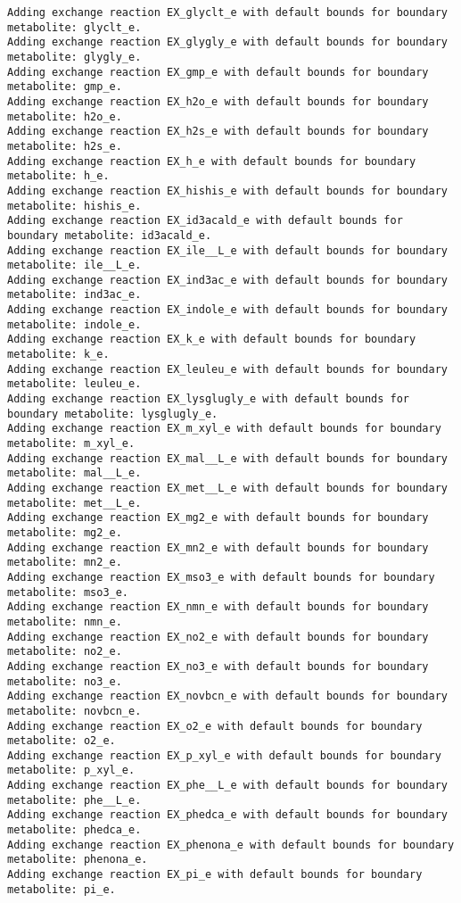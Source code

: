 \documentclass[
  letterpaper,
  DIV=11,
  numbers=noendperiod]{scrartcl}
\begin{document}
\begin{verbatim}
Adding exchange reaction EX_glyclt_e with default bounds for boundary metabolite: glyclt_e.
Adding exchange reaction EX_glygly_e with default bounds for boundary metabolite: glygly_e.
Adding exchange reaction EX_gmp_e with default bounds for boundary metabolite: gmp_e.
Adding exchange reaction EX_h2o_e with default bounds for boundary metabolite: h2o_e.
Adding exchange reaction EX_h2s_e with default bounds for boundary metabolite: h2s_e.
Adding exchange reaction EX_h_e with default bounds for boundary metabolite: h_e.
Adding exchange reaction EX_hishis_e with default bounds for boundary metabolite: hishis_e.
Adding exchange reaction EX_id3acald_e with default bounds for boundary metabolite: id3acald_e.
Adding exchange reaction EX_ile__L_e with default bounds for boundary metabolite: ile__L_e.
Adding exchange reaction EX_ind3ac_e with default bounds for boundary metabolite: ind3ac_e.
Adding exchange reaction EX_indole_e with default bounds for boundary metabolite: indole_e.
Adding exchange reaction EX_k_e with default bounds for boundary metabolite: k_e.
Adding exchange reaction EX_leuleu_e with default bounds for boundary metabolite: leuleu_e.
Adding exchange reaction EX_lysglugly_e with default bounds for boundary metabolite: lysglugly_e.
Adding exchange reaction EX_m_xyl_e with default bounds for boundary metabolite: m_xyl_e.
Adding exchange reaction EX_mal__L_e with default bounds for boundary metabolite: mal__L_e.
Adding exchange reaction EX_met__L_e with default bounds for boundary metabolite: met__L_e.
Adding exchange reaction EX_mg2_e with default bounds for boundary metabolite: mg2_e.
Adding exchange reaction EX_mn2_e with default bounds for boundary metabolite: mn2_e.
Adding exchange reaction EX_mso3_e with default bounds for boundary metabolite: mso3_e.
Adding exchange reaction EX_nmn_e with default bounds for boundary metabolite: nmn_e.
Adding exchange reaction EX_no2_e with default bounds for boundary metabolite: no2_e.
Adding exchange reaction EX_no3_e with default bounds for boundary metabolite: no3_e.
Adding exchange reaction EX_novbcn_e with default bounds for boundary metabolite: novbcn_e.
Adding exchange reaction EX_o2_e with default bounds for boundary metabolite: o2_e.
Adding exchange reaction EX_p_xyl_e with default bounds for boundary metabolite: p_xyl_e.
Adding exchange reaction EX_phe__L_e with default bounds for boundary metabolite: phe__L_e.
Adding exchange reaction EX_phedca_e with default bounds for boundary metabolite: phedca_e.
Adding exchange reaction EX_phenona_e with default bounds for boundary metabolite: phenona_e.
Adding exchange reaction EX_pi_e with default bounds for boundary metabolite: pi_e.

\end{verbatim}
\end{document}

